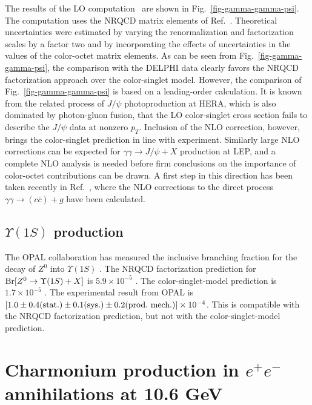 The results of the LO computation~\cite{Klasen:2001cu} are
shown in Fig.~\ref{fig-gamma-gamma-psi}. The computation uses the
NRQCD matrix elements of Ref.~\cite{Braaten:1999qk}. Theoretical
uncertainties were estimated by varying the renormalization and
factorization scales by a factor two and by incorporating the effects
of uncertainties in the values of the color-octet matrix elements. As
can be seen from Fig.~\ref{fig-gamma-gamma-psi}, the comparison with
the DELPHI data
\cite{Todorova-Nova:2001pt,Abdallah:2003du} clearly favors the
NRQCD factorization approach over the color-singlet model. However,
the comparison of Fig.~\ref{fig-gamma-gamma-psi} is based on a
leading-order calculation. It is known from the related process of
$J/\psi$ photoproduction at HERA, which is also dominated by
photon-gluon fusion, that the LO color-singlet cross section fails to
describe the $J/\psi$ data at nonzero $p_T$. Inclusion of the NLO
correction, however, brings the color-singlet prediction in line with
experiment. Similarly large NLO corrections can be expected for
${\gamma \gamma\rightarrow J/\psi +X}$ production at LEP, and a
complete NLO analysis is needed before firm conclusions on the
importance of color-octet contributions can be drawn.  A first step in
this direction has been taken recently in Ref.~\cite{Klasen:2004tz},
where the NLO corrections to the direct process $\gamma \gamma \to (c
\bar c ) + g$ have been calculated. 

\subsection{$\Upsilon(1S)$ production}

The OPAL collaboration has measured the inclusive branching fraction for
the decay of $Z^0$ into $\Upsilon(1S)$ \cite{Alexander:1995vh}. The
NRQCD factorization prediction for ${\rm Br}[Z^0\rightarrow \Upsilon(1S)
+ X]$ is $5.9\times 10^{-5}$ \cite{Cho:1995vv}. The color-singlet-model
prediction is $1.7\times 10^{-5}$
\cite{Keung:1980ev,Kuhn:1981jy,Abraham:1989ri,Hagiwara:1991mt,%
Braaten:1993mp,Cho:1995vv}. The experimental result from OPAL
\cite{Alexander:1995vh} is $[1.0\pm 0.4(\hbox{stat.})\pm
0.1(\hbox{sys.}) \pm 0.2(\hbox{prod.\ mech.})]\times 10^{-4}$.
This is compatible with the NRQCD factorization prediction, but not with
the color-singlet-model prediction.


\section{Charmonium production in $e^+e^-$ annihilations at 10.6 GeV}
\label{prodsec:eecontinuum}

